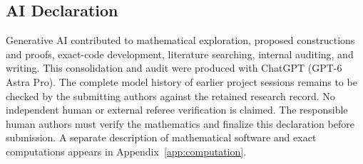 \subsection*{AI Declaration}
Generative AI contributed to mathematical exploration, proposed constructions and proofs, exact-code development, literature searching, internal auditing, and writing. This consolidation and audit were produced with ChatGPT (GPT-6 Astra Pro). The complete model history of earlier project sessions remains to be checked by the submitting authors against the retained research record. No independent human or external referee verification is claimed. The responsible human authors must verify the mathematics and finalize this declaration before submission. A separate description of mathematical software and exact computations appears in Appendix~\ref{app:computation}.
